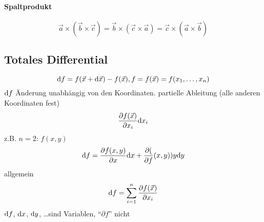 \paragraph{Spaltprodukt}
$$\vec a \times (\vec b \times \vec c) = \vec b \times (\vec c \times \vec a) = \vec c \times (\vec a \times \vec b)$$

\subsection{Totales Differential}
$$\mathrm d f = f(\vec{x} + \mathrm d \vec{x}) - f(\vec{x}), f = f(\vec{x}) = f(x_1, \dots, x_n)$$
$\mathrm d f$ Änderung unabhängig von den Koordinaten.
partielle Ableitung (alle anderen Koordinaten fest)
$$\frac{\partial f(\vec{x})}{\partial x_i} \mathrm d x_i$$
z.B. $n = 2$: $f (x, y)$
$$\mathrm d f = \frac{\partial f(x,y)}{\partial x} \mathrm d x + \frac{\partial (}{\partial f}(x,y)){y} \mathrm d y$$
allgemein
$$\mathrm d f = \sum_{i=1}^n \frac{\partial f(\vec{x})}{\partial x_i}$$
$\mathrm d f$, $\mathrm d x$, $\mathrm d y$, \dots sind Variablen, "`$\partial f$"' nicht

